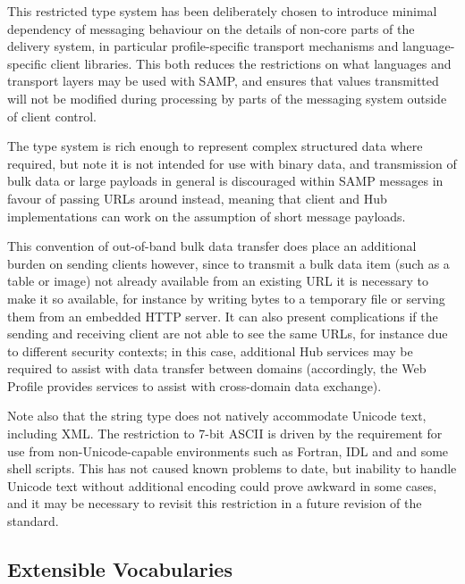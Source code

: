 \documentclass[5p]{elsarticle}
\begin{document}
This restricted type system has been deliberately chosen to introduce
minimal dependency of messaging behaviour on the details of
non-core parts of the delivery system,
in particular profile-specific transport mechanisms and language-specific
client libraries.
This both reduces the restrictions on what languages and transport layers
may be used with SAMP, and ensures that values transmitted will
not be modified during processing by parts of the messaging system
outside of client control.


The type system is rich enough to represent complex structured data
where required, but note it is not intended for use with
binary data, and transmission of bulk data or large payloads
in general is discouraged within SAMP messages in favour of
passing URLs around instead, meaning that
client and Hub implementations can work on the assumption
of short message payloads.

This convention of out-of-band bulk data transfer does place
an additional burden on sending clients however,
since to transmit a bulk data item (such as a table or image)
not already available from an existing URL
it is necessary to make it so available, for instance by writing
bytes to a temporary file or serving them from an embedded HTTP server.
It can also present complications if the sending and receiving client
are not able to see the same URLs, for instance due to different security
contexts; in this case, additional Hub services may be required to
assist with data transfer between domains
(accordingly, the Web Profile provides services to assist with
cross-domain data exchange).

Note also that the string type does not natively accommodate Unicode text,
including XML.
The restriction to 7-bit ASCII is driven by the requirement for use
from non-Unicode-capable environments such as Fortran, IDL and
and some shell scripts.
This has not caused known problems to date, but inability to handle
Unicode text without additional encoding could prove awkward in
some cases, and it may be necessary to revisit this restriction in a future
revision of the standard.

\subsection{Extensible Vocabularies} \label{sec:extVocabs}
\end{document}
